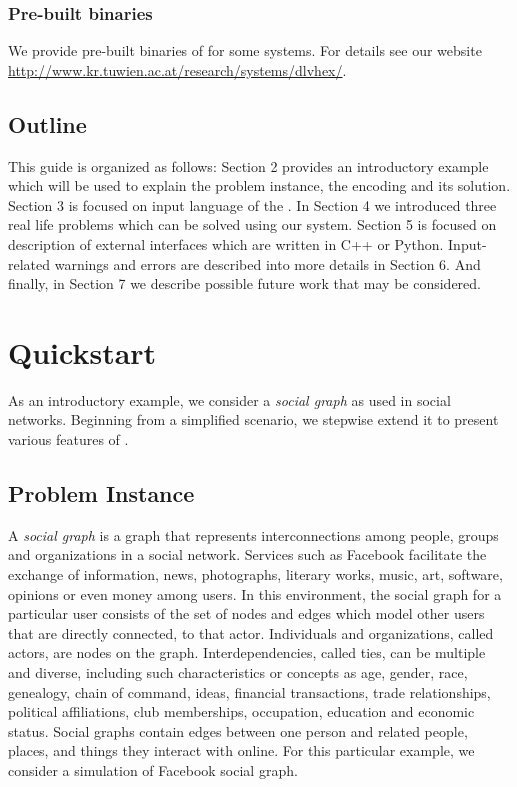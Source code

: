 \documentclass[14pt,a4paper, titlepage]{article}
\begin{document}
\subsubsection{Pre-built binaries}
We provide pre-built binaries of \dlvhex{} for some systems. For details see our website \url{http://www.kr.tuwien.ac.at/research/systems/dlvhex/}. 

\subsection{Outline}
This guide is organized as follows: Section 2 provides an introductory example which will be used to explain the problem instance, the encoding and its solution. Section 3 is focused on input language of the \dlvhex{}. In Section 4 we introduced three real life problems which can be solved using our system. Section 5 is focused on description of external interfaces which are written in C++ or Python. Input-related warnings and errors are described into more details in Section 6. And finally, in Section 7 we describe possible future work that may be considered.

\section{Quickstart} %
As an introductory example, we consider a \emph{social graph} as used in social networks. Beginning from a simplified scenario, we stepwise extend it to present various features of \dlvhex{}.

\subsection{Problem Instance}
A \emph{social graph} is a graph that represents interconnections among people, groups 
and organizations in a social network. Services such as Facebook facilitate the exchange 
of information, news, photographs, literary works, music, art, software, opinions or even 
money among users. In this environment, the social graph for a particular user consists 
of the set of nodes and edges which model other users that are directly connected, to that actor. 
Individuals and organizations, called actors, are nodes on the graph. Interdependencies, 
called ties, can be multiple and diverse, including such characteristics or concepts as age, 
gender, race, genealogy, chain of command, ideas, financial transactions, trade relationships, 
political affiliations, club memberships, occupation, education and economic status. 
Social graphs contain edges between one person and related people, places, and things they interact 
with online. For this particular example, we consider a simulation of Facebook social graph. 
\end{document}
